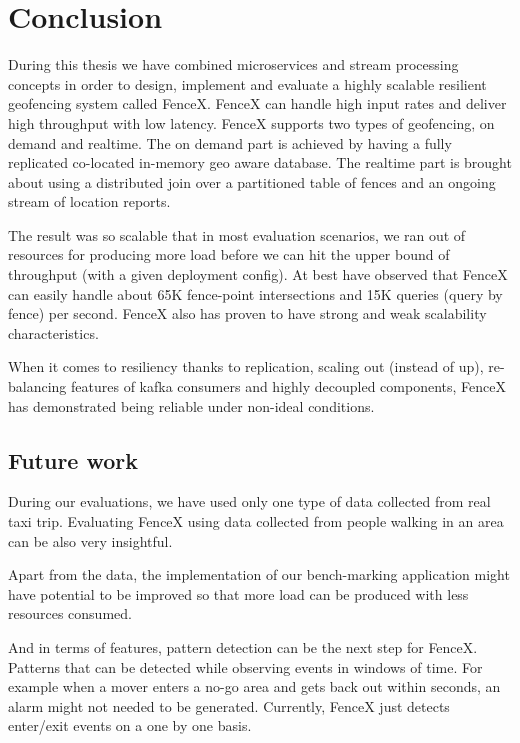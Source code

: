 \documentclass[a4]{report}
\begin{document}
        \chapter{Conclusion}
        During this thesis we have combined microservices and stream processing concepts in order to design, implement
        and evaluate a highly scalable resilient geofencing system called FenceX.
        FenceX can handle high input rates and deliver high throughput with low latency.
        FenceX supports two types of geofencing, on demand and realtime.
        The on demand part is achieved by having a fully replicated co-located in-memory geo aware database.
        The realtime part is brought about using a distributed join over a partitioned table of fences and an ongoing
        stream of location reports.

        The result was so scalable that in most evaluation scenarios, we ran out of resources for producing more load
        before we can hit the upper bound of throughput (with a given deployment config).
        At best have observed that FenceX can easily handle about 65K fence-point intersections and 15K queries (query by
        fence) per second.
        FenceX also has proven to have strong and weak scalability characteristics.

        When it comes to resiliency thanks to replication, scaling out (instead of up), re-balancing features of kafka
        consumers and highly decoupled components, FenceX has demonstrated being reliable under non-ideal conditions.

        \section{Future work}
        During our evaluations, we have used only one type of data collected from real taxi trip.
        Evaluating FenceX using data collected from people walking in an area can be also very insightful.

        Apart from the data, the implementation of our bench-marking application might have potential to be improved so
        that more load can be produced with less resources consumed.

        And in terms of features, pattern detection can be the next step for FenceX.
        Patterns that can be detected while observing events in windows of time.
        For example when a mover enters a no-go area and gets back out within seconds, an alarm might not needed to be
        generated.
        Currently, FenceX just detects enter/exit events on a one by one basis.
\end{document}
